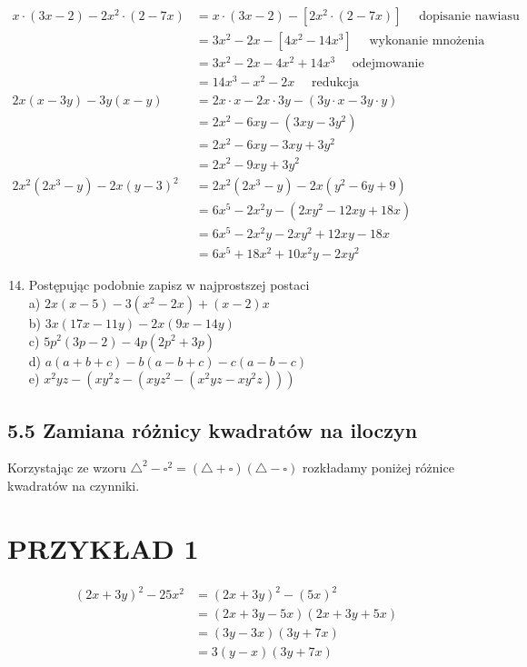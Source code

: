 \documentclass[10pt]{article}
\begin{document}
\[
\begin{aligned}
x \cdot(3 x-2)-2 x^{2} \cdot(2-7 x) & =x \cdot(3 x-2)-\left[2 x^{2} \cdot(2-7 x)\right] \quad \text { dopisanie nawiasu } \\
& =3 x^{2}-2 x-\left[4 x^{2}-14 x^{3}\right] \quad \text { wykonanie mnożenia } \\
& =3 x^{2}-2 x-4 x^{2}+14 x^{3} \quad \text { odejmowanie } \\
& =14 x^{3}-x^{2}-2 x \quad \text { redukcja } \\
2 x(x-3 y)-3 y(x-y) & =2 x \cdot x-2 x \cdot 3 y-(3 y \cdot x-3 y \cdot y) \\
& =2 x^{2}-6 x y-\left(3 x y-3 y^{2}\right) \\
& =2 x^{2}-6 x y-3 x y+3 y^{2} \\
& =2 x^{2}-9 x y+3 y^{2} \\
2 x^{2}\left(2 x^{3}-y\right)-2 x(y-3)^{2} & =2 x^{2}\left(2 x^{3}-y\right)-2 x\left(y^{2}-6 y+9\right) \\
& =6 x^{5}-2 x^{2} y-\left(2 x y^{2}-12 x y+18 x\right) \\
& =6 x^{5}-2 x^{2} y-2 x y^{2}+12 x y-18 x \\
& =6 x^{5}+18 x^{2}+10 x^{2} y-2 x y^{2}
\end{aligned}
\]

\begin{enumerate}
  \setcounter{enumi}{13}
  \item Postępując podobnie zapisz w najprostszej postaci\\
a) \(2 x(x-5)-3\left(x^{2}-2 x\right)+(x-2) x\)\\
b) \(3 x(17 x-11 y)-2 x(9 x-14 y)\)\\
c) \(5 p^{2}(3 p-2)-4 p\left(2 p^{2}+3 p\right)\)\\
d) \(a(a+b+c)-b(a-b+c)-c(a-b-c)\)\\
e) \(x^{2} y z-\left(x y^{2} z-\left(x y z^{2}-\left(x^{2} y z-x y^{2} z\right)\right)\right)\)
\end{enumerate}

\subsection*{5.5 Zamiana różnicy kwadratów na iloczyn}
Korzystając ze wzoru \(\triangle^{2}-\square^{2}=(\triangle+\square)(\triangle-\square)\) rozkładamy poniżej różnice kwadratów na czynniki.

\section*{PRZYKŁAD 1}
\[
\begin{aligned}
(2 x+3 y)^{2}-25 x^{2} & =(2 x+3 y)^{2}-(5 x)^{2} \\
& =(2 x+3 y-5 x)(2 x+3 y+5 x) \\
& =(3 y-3 x)(3 y+7 x) \\
& =3(y-x)(3 y+7 x)
\end{aligned}
\]
\end{document}
